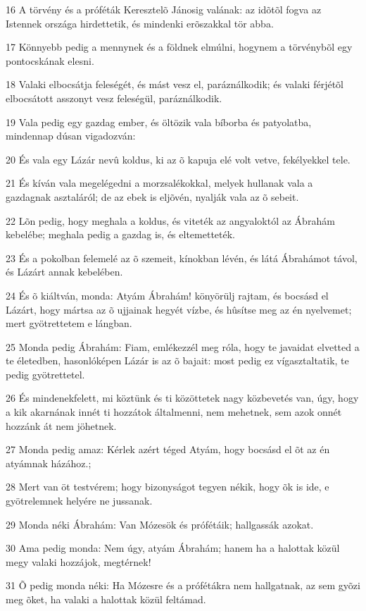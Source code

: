 \par 16 A törvény és a próféták Keresztelõ Jánosig valának: az idõtõl fogva az Istennek  országa hirdettetik, és mindenki erõszakkal tör abba.
\par 17 Könnyebb pedig a mennynek és a földnek elmúlni, hogynem a törvénybõl egy  pontocskának elesni.
\par 18 Valaki elbocsátja feleségét, és mást vesz el, paráználkodik; és valaki férjétõl elbocsátott asszonyt vesz feleségül, paráználkodik.
\par 19 Vala pedig egy gazdag ember, és öltözik vala bíborba és patyolatba, mindennap dúsan vigadozván:
\par 20 És vala egy Lázár nevû koldus, ki az õ kapuja elé volt vetve, fekélyekkel tele.
\par 21 És kíván vala megelégedni a morzsalékokkal, melyek hullanak vala a gazdagnak asztaláról; de az ebek is eljõvén, nyalják vala az õ sebeit.
\par 22 Lõn pedig, hogy meghala a koldus, és viteték az angyaloktól az Ábrahám kebelébe; meghala pedig a gazdag is, és eltemetteték.
\par 23 És a pokolban felemelé az õ szemeit, kínokban lévén, és látá Ábrahámot távol, és Lázárt annak kebelében.
\par 24 És õ kiáltván, monda: Atyám Ábrahám! könyörülj rajtam, és bocsásd el Lázárt, hogy mártsa az õ ujjainak hegyét vízbe, és hûsítse meg az én nyelvemet; mert gyötrettetem e lángban.
\par 25 Monda pedig Ábrahám: Fiam, emlékezzél meg róla, hogy te javaidat elvetted a te életedben, hasonlóképen Lázár is az õ bajait: most pedig ez vígasztaltatik, te pedig gyötrettetel.
\par 26 És mindenekfelett, mi köztünk és ti közöttetek nagy közbevetés van, úgy, hogy a kik akarnának innét ti hozzátok általmenni, nem mehetnek, sem azok onnét hozzánk át nem jöhetnek.
\par 27 Monda pedig amaz: Kérlek azért téged Atyám, hogy bocsásd el õt az én atyámnak házához.;
\par 28 Mert van öt testvérem; hogy bizonyságot tegyen nékik, hogy õk is ide, e gyötrelemnek helyére ne jussanak.
\par 29 Monda néki Ábrahám: Van Mózesök és prófétáik; hallgassák azokat.
\par 30 Ama pedig monda: Nem úgy, atyám Ábrahám; hanem ha a halottak közül megy valaki hozzájok, megtérnek!
\par 31 Õ pedig monda néki: Ha Mózesre és a prófétákra nem hallgatnak, az sem gyõzi meg õket, ha valaki a halottak közül feltámad.

